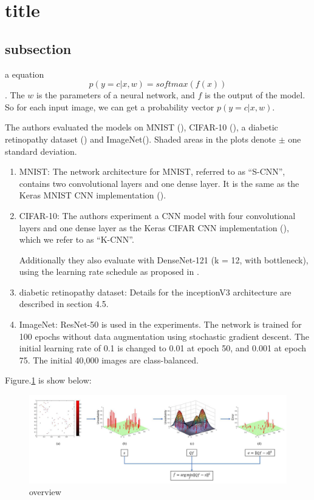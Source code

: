 \section{title}

\subsection{subsection}

a equation
$$
p(y=c|x, w) = softmax(f(x))
$$
. The $w$ is the parameters of a neural network, and $f$ is the output of the model. So for each input image, we can get a probability vector $p(y=c|x, w)$.

The authors evaluated the models on MNIST (\cite{mnist}), CIFAR-10 (\cite{cifar10}), a diabetic retinopathy dataset (\cite{retinopathy}) and ImageNet(\cite{resnet}). Shaded areas in the plots denote $\pm$ one standard deviation.


\begin{enumerate}
    \item MNIST: The network architecture for MNIST, referred to as “S-CNN”, contains two convolutional layers and one dense layer. It is the same as the Keras MNIST CNN implementation (\cite{keras_cnn}).
    \item CIFAR-10: The authors experiment a CNN model with four convolutional layers and one dense layer as the Keras CIFAR CNN implementation (\cite{keras_cnn}), which we refer to as “K-CNN”. 
    
    Additionally they also evaluate with DenseNet-121 (k = 12, with bottleneck), using the learning rate schedule as proposed in \cite{denseNet}. 
    \item diabetic retinopathy dataset: Details for the inceptionV3 architecture are described in section 4.5.
    \item ImageNet: ResNet-50\cite{resnet} is used in the experiments. The network is trained for 100 epochs without data augmentation using stochastic gradient descent. The initial learning rate of 0.1 is changed to 0.01 at epoch 50, and 0.001 at epoch 75. The initial 40,000 images are class-balanced.
\end{enumerate}

Figure.\ref{figure1} is show below:

\begin{figure}[ht!]
    \centering
    \includegraphics[width=15.4cm]{sparse_overview.png}
    \caption{overview}
    \label{figure1}
\end{figure}
